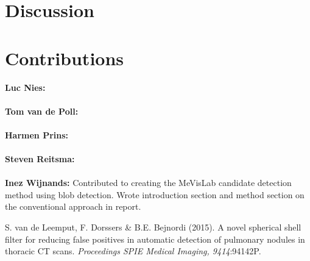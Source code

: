 \documentclass{article}
\begin{document}
\section{Discussion}\label{sec:discussion}


\appendix
\section{Contributions}
\textbf{Luc Nies:} \\
\\
\textbf{Tom van de Poll:} \\
\\
\textbf{Harmen Prins:} \\
\\
\textbf{Steven Reitsma:} \\
\\
\textbf{Inez Wijnands:} Contributed to creating the MeVisLab candidate detection method using blob detection. Wrote introduction section and method section on the conventional approach in report.



\begin{thebibliography}{}

S. van de Leemput, F. Dorssers \& B.E. Bejnordi (2015). A novel spherical shell filter for reducing false positives in automatic detection of pulmonary nodules in thoracic CT scans. \emph{Proceedings SPIE Medical Imaging, 9414}:94142P.
\end{thebibliography}
\end{document}

